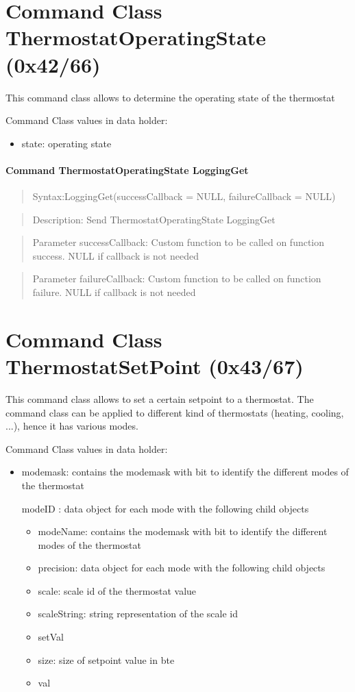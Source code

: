 \section{Command Class ThermostatOperatingState (0x42/66)}

This command class allows to determine the operating state of the thermostat

Command Class values in data holder:
\begin{itemize}
\item state:  operating state 
\end{itemize}

\paragraph {Command ThermostatOperatingState LoggingGet}
\begin{quote} Syntax:LoggingGet(successCallback = NULL, failureCallback = NULL)\end{quote}
\begin{quote} Description: Send ThermostatOperatingState LoggingGet\end{quote}
\begin{quote} Parameter successCallback: Custom function to be called on function success. NULL if callback is not needed\end{quote}
\begin{quote} Parameter failureCallback: Custom function to be called on function failure. NULL if callback is not needed\end{quote}


\section{Command Class ThermostatSetPoint (0x43/67)}

This command class  allows to set a certain setpoint to a thermostat. The command class can be applied to different kind of thermostats 
(heating, cooling, ...), hence it has various modes.

Command Class values in data holder:
\begin{itemize}
\item modemask: contains the modemask with bit to identify the different modes of the thermostat
\item [modeID]:  data object for each mode with the following child objects
\begin{itemize}
\item modeName: contains the modemask with bit to identify the different modes of the thermostat
\item precision:  data object for each mode with the following child objects
\item scale: scale id of the thermostat value
\item scaleString: string representation of the scale id
\item setVal
\item size: size of setpoint value in bte
\item val
\end{itemize}
\end{itemize}

